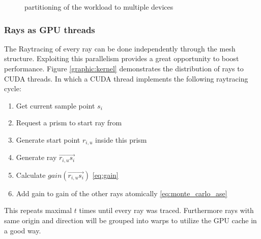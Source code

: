 \begin{figure}[H]
  \centerline
  {}
  \caption{partitioning of the workload to multiple devices}
  \label{graphic:multigpu}
\end{figure}

\subsubsection{Rays as GPU threads}
    The Raytracing of every ray can be done independently 
    through the mesh structure. 
    Exploiting this parallelism provides a great opportunity to boost
    performance. Figure \ref{graphic:kernel} demonstrates the distribution
    of rays to CUDA threads. In which a CUDA thread implements the following
    raytracing cycle:
    \begin{enumerate}
      \item Get current sample point $s_i$
      \item Request a prism to start ray from
      \item Generate start point $r_{i,u}$ inside this prism 
      \item Generate ray $\overrightarrow{r_{i,u}s_i}$
      \item Calculate $gain(\overrightarrow{r_{i,u}s_i})$ \eqref{eq:gain}
      \item Add gain to gain of the other rays atomically \eqref{eq:monte_carlo_ase}
    \end{enumerate}
    This repeats maximal $t$ times until every ray was traced. Furthermore rays with same
    origin and direction will be grouped into warps to utilize the
    GPU cache in a good way.


